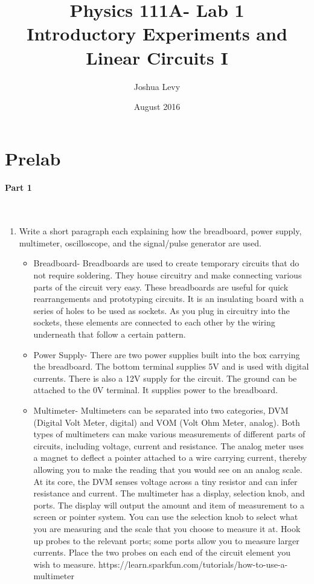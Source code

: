 \documentclass{article}
\title{Physics 111A- Lab 1\\
Introductory Experiments and Linear Circuits I}
\author{Joshua Levy }
\date{August 2016}
\begin{document}
\section{Prelab}

\paragraph{Part 1} ~\\

\begin{enumerate}
    \item Write a short paragraph each explaining how the breadboard, power supply, multimeter, oscilloscope, and the signal/pulse generator are used. 
    \begin{itemize}
        \item Breadboard- Breadboards are used to create temporary circuits that do not require soldering. They house circuitry and make connecting various parts of the circuit very easy. These breadboards are useful for quick rearrangements and prototyping circuits. It is an insulating board with a series of holes to be used as sockets. As you plug in circuitry into the sockets, these elements are connected to each other by the wiring underneath that follow a certain pattern.
        \item Power Supply- There are two power supplies built into the box carrying the breadboard. The bottom terminal supplies 5V and is used with digital currents. There is also a 12V supply for the circuit. The ground can be attached to the 0V terminal. It supplies power to the breadboard.
        \item Multimeter- Multimeters can be separated into two categories, DVM (Digital Volt Meter, digital) and VOM (Volt Ohm Meter, analog). Both types of multimeters can make various measurements of different parts of circuits, including voltage, current and resistance. The analog meter uses a magnet to deflect a pointer attached to a wire carrying current, thereby allowing you to make the reading that you would see on an analog scale. At its core, the DVM senses voltage across a tiny resistor and can infer resistance and current. The multimeter has a display, selection knob, and ports. The display will output the amount and item of measurement to a screen or pointer system. You can use the selection knob to select what you are measuring and the scale that you choose to measure it at. Hook up probes to the relevant ports; some ports allow you to measure larger currents. Place the two probes on each end of the circuit element you wish to measure. https://learn.sparkfun.com/tutorials/how-to-use-a-multimeter

\end{itemize}
\end{enumerate}
\end{document}
